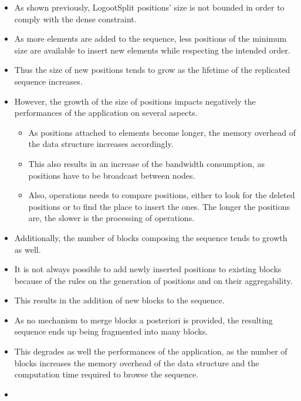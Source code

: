 \documentclass{article}
\theoremstyle{definition}
\newcounter{note-counter}
\theoremstyle{definition}
\theoremstyle{definition}
\theoremstyle{definition}
\begin{document}
\begin{itemize}
    \item As shown previously, LogootSplit positions' size is not bounded in order to comply with the dense constraint.
    \item As more elements are added to the sequence, less positions of the minimum size are available to insert new elements while respecting the intended order.
    \item Thus the size of new positions tends to grow as the lifetime of the replicated sequence increases.
    \item However, the growth of the size of positions impacts negatively the performances of the application on several aspects.
    \begin{itemize}
        \item As positions attached to elements become longer, the memory overhead of the data structure increases accordingly.
        \item This also results in an increase of the bandwidth consumption, as positions have to be broadcast between nodes.
        \item Also, operations needs to compare positions, either to look for the deleted positions or to find the place to insert the ones. The longer the positions are, the slower is the processing of operations.
    \end{itemize}
    \item Additionally, the number of blocks composing the sequence tends to growth as well.
    \item It is not always possible to add newly inserted positions to existing blocks because of the rules on the generation of positions and on their aggregability.
    \item This results in the addition of new blocks to the sequence.
    \item As no mechanism to merge blocks a posteriori is provided, the resulting sequence ends up being fragmented into many blocks.
    \item This degrades as well the performances of the application, as the number of blocks increases the memory overhead of the data structure and the computation time required to browse the sequence.
    \item {}
\end{itemize}
\end{document}
